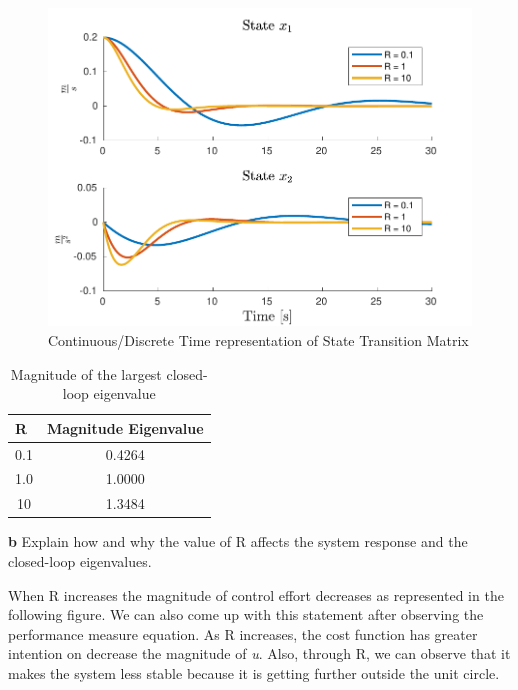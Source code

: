 \documentclass{article}
\begin{document}
\begin{center} \begin{figure} [h]
\includegraphics [width=4.5in]{fig1.pdf}
\caption{Continuous/Discrete Time representation of State Transition Matrix}
\end{figure}  \end{center}

\begin{table}[h]
\centering
\caption{Magnitude of the largest closed-loop eigenvalue}
\label{my-label}
\begin{tabular}{|c|c|}
\hline
\multicolumn{1}{|l|}{\textbf{R}} & \multicolumn{1}{l|}{\textbf{Magnitude Eigenvalue}} \\ \hline
0.1                              & 0.4264                                             \\ \hline
1.0                              & 1.0000                                             \\ \hline
10                               & 1.3484                                             \\ \hline
\end{tabular}
\end{table}

\pagebreak
\textbf{b }Explain how and why the value of R affects the system response and the closed-loop eigenvalues.

	When R increases the magnitude of control effort decreases as represented in the following figure. We can also come up with this statement after observing the performance measure equation. As R increases, the cost function has greater intention on decrease the magnitude of \textit{u}. Also, through R, we can observe that it makes the system less stable because it is getting further outside the unit circle. 
\end{document}
